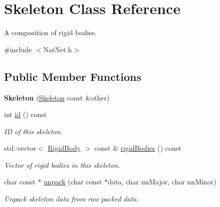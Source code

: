 \hypertarget{classSkeleton}{\section{\-Skeleton \-Class \-Reference}
\label{classSkeleton}
}


\-A composition of rigid bodies.  




{\ttfamily \#include $<$\-Nat\-Net.\-h$>$}

\subsection*{\-Public \-Member \-Functions}
\begin{DoxyCompactItemize}
\item 
\hypertarget{classSkeleton_a274c98bf3296e2812e40696c092e7b94}{{\bfseries \-Skeleton} (\hyperlink{classSkeleton}{\-Skeleton} const \&other)}\label{classSkeleton_a274c98bf3296e2812e40696c092e7b94}

\item 
\hypertarget{classSkeleton_ad4d0cae31c1627a045a9a1d44b1fc895}{int \hyperlink{classSkeleton_ad4d0cae31c1627a045a9a1d44b1fc895}{id} () const }\label{classSkeleton_ad4d0cae31c1627a045a9a1d44b1fc895}

\begin{DoxyCompactList}\small\item\em \-I\-D of this skeleton. \end{DoxyCompactList}\item 
\hypertarget{classSkeleton_a9204c7a748ee645a4c453e1dda2f5b00}{std\-::vector$<$ \hyperlink{classRigidBody}{\-Rigid\-Body} $>$ const \& \hyperlink{classSkeleton_a9204c7a748ee645a4c453e1dda2f5b00}{rigid\-Bodies} () const }\label{classSkeleton_a9204c7a748ee645a4c453e1dda2f5b00}

\begin{DoxyCompactList}\small\item\em \-Vector of rigid bodies in this skeleton. \end{DoxyCompactList}\item 
char const $\ast$ \hyperlink{classSkeleton_ae33215cf30ae6ce68588128f6c713e49}{unpack} (char const $\ast$data, char nn\-Major, char nn\-Minor)
\begin{DoxyCompactList}\small\item\em \-Unpack skeleton data from raw packed data. \end{DoxyCompactList}\end{DoxyCompactItemize}


